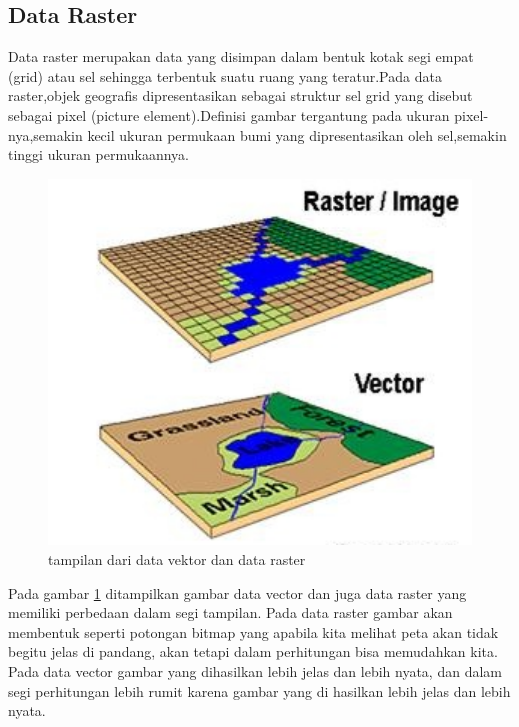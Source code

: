 \subsection{Data Raster}
Data raster merupakan data yang disimpan dalam bentuk kotak segi empat (grid)
atau sel sehingga terbentuk suatu ruang yang teratur.Pada data raster,objek geografis dipresentasikan sebagai struktur sel grid yang disebut sebagai pixel (picture element).Definisi gambar tergantung pada ukuran pixel-nya,semakin kecil ukuran permukaan bumi yang dipresentasikan oleh sel,semakin tinggi ukuran permukaannya.
\begin{figure}[ht]
\centerline{\includegraphics[width=1\textwidth] {figures/vektor01.jpg}}
\caption{tampilan dari data vektor dan data raster}
\label{vektor01}
\end{figure}
Pada gambar \ref{vektor01} ditampilkan gambar data vector dan juga data raster yang memiliki perbedaan dalam segi tampilan. Pada data raster gambar akan membentuk seperti potongan bitmap yang apabila kita melihat peta akan tidak begitu jelas di pandang, akan tetapi dalam perhitungan bisa memudahkan kita. Pada data vector gambar yang dihasilkan lebih jelas dan lebih nyata, dan dalam segi perhitungan lebih rumit karena gambar yang di hasilkan lebih jelas dan lebih nyata.

